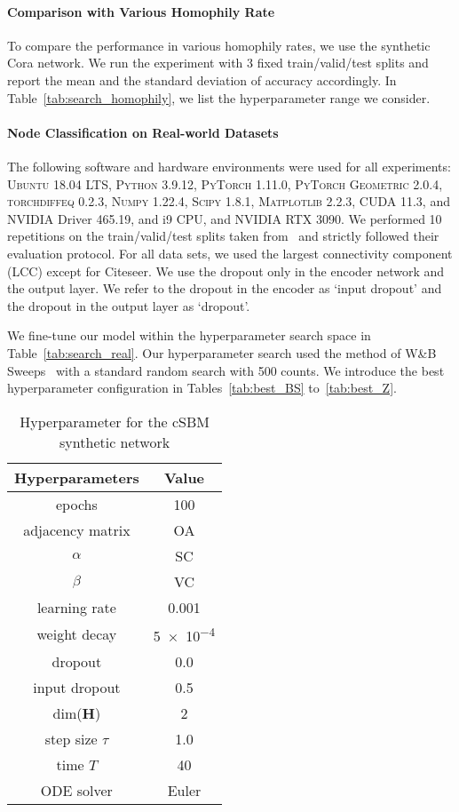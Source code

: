 \documentclass{article}
\theoremstyle{plain}
\theoremstyle{definition}
\theoremstyle{remark}
\begin{document}
\paragraph{Comparison with Various Homophily Rate}
To compare the performance in various homophily rates, we use the synthetic Cora network. We run the experiment with 3 fixed train/valid/test splits and report the mean and the standard deviation of accuracy accordingly. In Table~\ref{tab:search_homophily}, we list the hyperparameter range we consider.

\paragraph{Node Classification on Real-world Datasets}
The following software and hardware environments were used for all experiments: \textsc{Ubuntu} 18.04 LTS, \textsc{Python} 3.9.12,  \textsc{PyTorch} 1.11.0, \textsc{PyTorch Geometric} 2.0.4, \textsc{torchdiffeq} 0.2.3, \textsc{Numpy} 1.22.4, \textsc{Scipy} 1.8.1, \textsc{Matplotlib} 2.2.3, \textsc{CUDA} 11.3, and \textsc{NVIDIA} Driver 465.19, and i9 CPU, and \textsc{NVIDIA RTX 3090}.  We performed 10 repetitions on the train/valid/test splits taken from~\cite{pei2020geomGCN} and strictly followed their evaluation protocol. For all data sets, we used the largest connectivity component (LCC) except for Citeseer. We use the dropout only in the encoder network and the output layer. We refer to the dropout in the encoder as `input dropout' and  the dropout in the output layer as `dropout'. 


We fine-tune our model within the hyperparameter search space in Table~\ref{tab:search_real}. Our hyperparameter search used the method of W\&B Sweeps~\cite{wandb2020} with a standard random search with 500 counts. We introduce the best hyperparameter configuration in Tables~\ref{tab:best_BS} to~\ref{tab:best_Z}.

\begin{table}[ht!]
    \centering
    \caption{Hyperparameter for the cSBM synthetic network}
    \begin{tabular}{cc} \toprule
        Hyperparameters  &  Value \\ \midrule
        epochs           & 100 \\
        adjacency matrix & OA \\
        $\alpha$         & SC \\
        $\beta$          & VC \\
        learning rate    & 0.001\\
        weight decay     & \num{5e-4}\\
        dropout          & 0.0\\
        input dropout    & 0.5\\
        dim($\mathbf{H}$)& 2\\
        step size $\tau$ & 1.0\\
        time $T$         & 40 \\
        ODE solver       & Euler\\
        \bottomrule
    \end{tabular}
    \label{tab:hyperparams_energy}
\end{table}
\end{document}
